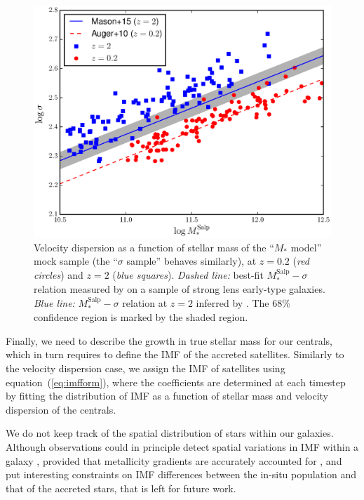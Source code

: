 \documentclass[usenatbib]{mnras}
\def\msalp{M_*^{\mathrm{Salp}}}
\def\Eref#1{equation~(\ref{#1})\xspace}
\begin{document}
\begin{figure}
 \includegraphics[width=\columnwidth]{mstar-vdisp_evolution.eps}
 \caption{ Velocity dispersion as a function of stellar mass of
     the ``$M_*$ model'' mock sample (the ``$\sigma$ sample'' behaves
     similarly), at $z=0.2$ ({\em red circles}) and $z=2$ ({\em blue
     squares}).  {\em Dashed line:} best-fit $\msalp-\sigma$ relation
   measured by \citet{Aug++10} on a sample of strong lens early-type
   galaxies.  {\em Blue line:} $\msalp-\sigma$ relation
   at $z=2$ inferred by \citet{Mas++15}. 
   The $68\%$
   confidence region is marked by the shaded region.}
 \label{fig:vdisp}
\end{figure}
%

Finally, we need to describe the growth in true stellar mass for our centrals, which in turn requires to define the IMF of the accreted satellites.
Similarly to the velocity dispersion case, we assign the IMF of satellites using \Eref{eq:imfform}, where the coefficients are determined at each timestep by fitting the distribution of IMF as a function of stellar mass and velocity dispersion of the centrals.

We do not keep track of the spatial distribution of stars within our galaxies. Although observations could in principle detect spatial variations in IMF within a galaxy \citep{Mar++15}, provided that metallicity gradients are accurately accounted for \citep{MLM16}, and put interesting constraints on IMF differences between the in-situ population and that of the accreted stars, that is left for future work.
\end{document}
